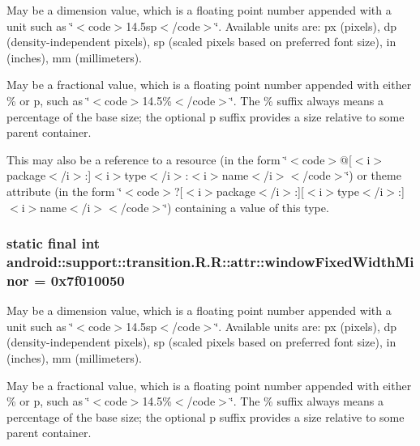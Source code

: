 May be a dimension value, which is a floating point number appended with a unit such as \char`\"{}$<$code$>$14.5sp$<$/code$>$\char`\"{}. Available units are: px (pixels), dp (density-independent pixels), sp (scaled pixels based on preferred font size), in (inches), mm (millimeters). 

May be a fractional value, which is a floating point number appended with either \% or p, such as \char`\"{}$<$code$>$14.5\%$<$/code$>$\char`\"{}. The \% suffix always means a percentage of the base size; the optional p suffix provides a size relative to some parent container. 

This may also be a reference to a resource (in the form \char`\"{}$<$code$>$@\mbox{[}$<$i$>$package$<$/i$>$:\mbox{]}$<$i$>$type$<$/i$>$:$<$i$>$name$<$/i$>$$<$/code$>$\char`\"{}) or theme attribute (in the form \char`\"{}$<$code$>$?\mbox{[}$<$i$>$package$<$/i$>$:\mbox{]}\mbox{[}$<$i$>$type$<$/i$>$:\mbox{]}$<$i$>$name$<$/i$>$$<$/code$>$\char`\"{}) containing a value of this type. \hypertarget{classandroid_1_1support_1_1transition_1_1_r_1_1attr_79a2d69a14c6402da47aa045e02bded0}{
\subsubsection[{windowFixedWidthMinor}]{\setlength{\rightskip}{0pt plus 5cm}static final int android::support::transition.R.R::attr::windowFixedWidthMinor = 0x7f010050}}
\label{classandroid_1_1support_1_1transition_1_1_r_1_1attr_79a2d69a14c6402da47aa045e02bded0}


May be a dimension value, which is a floating point number appended with a unit such as \char`\"{}$<$code$>$14.5sp$<$/code$>$\char`\"{}. Available units are: px (pixels), dp (density-independent pixels), sp (scaled pixels based on preferred font size), in (inches), mm (millimeters). 

May be a fractional value, which is a floating point number appended with either \% or p, such as \char`\"{}$<$code$>$14.5\%$<$/code$>$\char`\"{}. The \% suffix always means a percentage of the base size; the optional p suffix provides a size relative to some parent container. 


